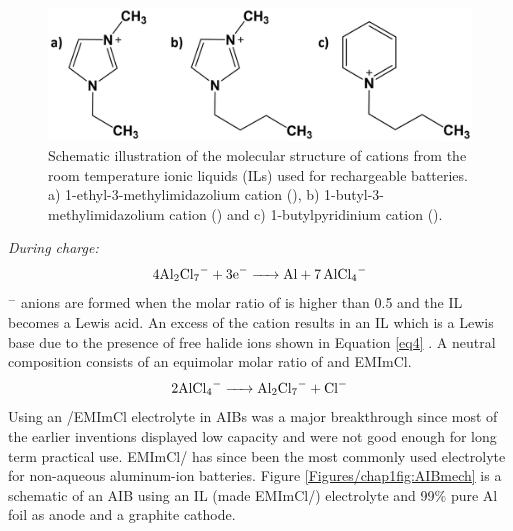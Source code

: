 \begin{figure}[tbh!]
\centering
\includegraphics[width=\textwidth]{Figures/chap1fig/cations}
\caption{Schematic illustration of the molecular structure of cations from the room temperature ionic liquids (ILs) used for rechargeable batteries. a) 1-ethyl-3-methylimidazolium cation (), b) 1-butyl-3- methylimidazolium cation () and c) 1-butylpyridinium cation ().}
\label{Figures/chap1fig:cations}
\end{figure}
\textit{During charge:}
\begin{equation} \label{eq3}
4\ce{Al2Cl7^{-}} + 3\ce{e- -> Al + 7AlCl4^{-}} 
\end{equation}
$^-$ anions are formed when the molar ratio of  is higher than 0.5 and the IL becomes a Lewis acid. An excess of the cation results in an IL which is a Lewis base due to the presence of free halide ions shown in Equation \ref{eq4} \cite{holbrey_ionic_1999}. A neutral composition consists of an equimolar molar ratio of  and EMImCl. \\
\begin{equation} \label{eq4}
2\ce{AlCl4^{-} -> Al2Cl7^{-} + Cl-}  
\end{equation}
Using an /EMImCl electrolyte in AIBs was a major breakthrough since most of the earlier inventions displayed low capacity and were not good enough for long term practical use. EMImCl/  has since been the most commonly used electrolyte for non-aqueous aluminum-ion batteries.
Figure \ref{Figures/chap1fig:AIBmech} is a schematic of an AIB using an IL  (made EMImCl/) electrolyte and 99\% pure Al foil as anode and a graphite cathode. 


